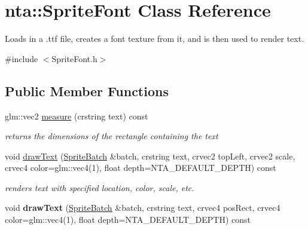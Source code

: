 \hypertarget{classnta_1_1SpriteFont}{}\section{nta\+:\+:Sprite\+Font Class Reference}
\label{classnta_1_1SpriteFont}


Loads in a .ttf file, creates a font texture from it, and is then used to render text.  




{\ttfamily \#include $<$Sprite\+Font.\+h$>$}

\subsection*{Public Member Functions}
\begin{DoxyCompactItemize}
\item 
\mbox{\label{classnta_1_1SpriteFont_a195ee5502390cd373463a774641a4677}} 
glm\+::vec2 \hyperlink{classnta_1_1SpriteFont_a195ee5502390cd373463a774641a4677}{measure} (crstring text) const
\begin{DoxyCompactList}\small\item\em returns the dimensions of the rectangle containing the text \end{DoxyCompactList}\item 
\mbox{\label{classnta_1_1SpriteFont_afdd646f19b11d9c8128151afad994a77}} 
void \hyperlink{classnta_1_1SpriteFont_afdd646f19b11d9c8128151afad994a77}{draw\+Text} (\hyperlink{classnta_1_1SpriteBatch}{Sprite\+Batch} \&batch, crstring text, crvec2 top\+Left, crvec2 scale, crvec4 color=glm\+::vec4(1), float depth=N\+T\+A\+\_\+\+D\+E\+F\+A\+U\+L\+T\+\_\+\+D\+E\+P\+TH) const
\begin{DoxyCompactList}\small\item\em renders text with specified location, color, scale, etc. \end{DoxyCompactList}\item 
\mbox{\label{classnta_1_1SpriteFont_af2f85910e0f7fc8a2633088bf791da9f}} 
void {\bfseries draw\+Text} (\hyperlink{classnta_1_1SpriteBatch}{Sprite\+Batch} \&batch, crstring text, crvec4 pos\+Rect, crvec4 color=glm\+::vec4(1), float depth=N\+T\+A\+\_\+\+D\+E\+F\+A\+U\+L\+T\+\_\+\+D\+E\+P\+TH) const
\item 

\end{DoxyCompactItemize}
